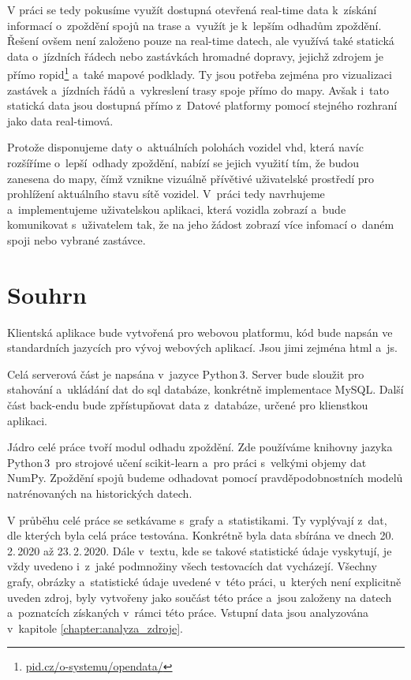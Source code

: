\bigbreak

V práci se tedy pokusíme využít dostupná otevřená real-time data k~získání informací o~zpoždění spojů na trase a~využít je k~lepším odhadům zpoždění. Řešení ovšem není založeno pouze na real-time datech, ale využívá také statická data o~jízdních řádech nebo zastávkách hromadné dopravy, jejichž zdrojem je přímo \gls{ropid}\footnote{\url{pid.cz/o-systemu/opendata/}} a~také mapové podklady. Ty jsou potřeba zejména pro vizualizaci zastávek a~jízdních řádů a~vykreslení trasy spoje přímo do mapy. Avšak i~tato statická data jsou dostupná přímo z~Datové platformy pomocí stejného rozhraní jako data real-timová.

\bigbreak

Protože disponujeme daty o~aktuálních polohách vozidel \gls{vhd}, která navíc rozšíříme o~lepší odhady zpoždění, nabízí se jejich využití tím, že budou zanesena do mapy, čímž vznikne vizuálně přívětivé uživatelské prostředí pro prohlížení aktuálního stavu sítě vozidel. V~práci tedy navrhujeme a~implementujeme uživatelskou aplikaci, která vozidla zobrazí a~bude komunikovat s~uživatelem tak, že na jeho žádost zobrazí více infomací o~daném spoji nebo vybrané zastávce.

\section*{Souhrn}

Klientská aplikace bude vytvořená pro webovou platformu, kód bude napsán ve standardních jazycích pro vývoj webových aplikací. Jsou jimi zejména \gls{html} a~\gls{js}.

\bigbreak

Celá serverová část je napsána v~jazyce Python\,3. Server bude sloužit pro stahování a~ukládání dat do \gls{sql} databáze, konkrétně implementace MySQL. Další část back-endu bude zpřístupňovat data z~databáze, určené pro klienstkou aplikaci.

\bigbreak

Jádro celé práce tvoří modul odhadu zpoždění. Zde používáme knihovny jazyka Python\,3~pro strojové učení scikit-learn a~pro práci s~velkými objemy dat NumPy. Zpoždění spojů budeme odhadovat pomocí pravděpodobnostních modelů natrénovaných na historických datech.

\bigbreak

V průběhu celé práce se setkávame s~grafy a~statistikami. Ty vyplývají z~dat, dle kterých byla celá práce testována. Konkrétně byla data sbírána ve dnech 20.\,2.\,2020 až 23.\,2.\,2020. Dále v~textu, kde se takové statistické údaje vyskytují, je vždy uvedeno i~z~jaké podmnožiny všech testovacích dat vycházejí. Všechny grafy, obrázky a~statistické údaje uvedené v~této práci, u~kterých není explicitně uveden zdroj, byly vytvořeny jako součást této práce a~jsou založeny na datech a~poznatcích získaných v~rámci této práce. Vstupní data jsou analyzována v~kapitole \ref{chapter:analyza_zdroje}.

